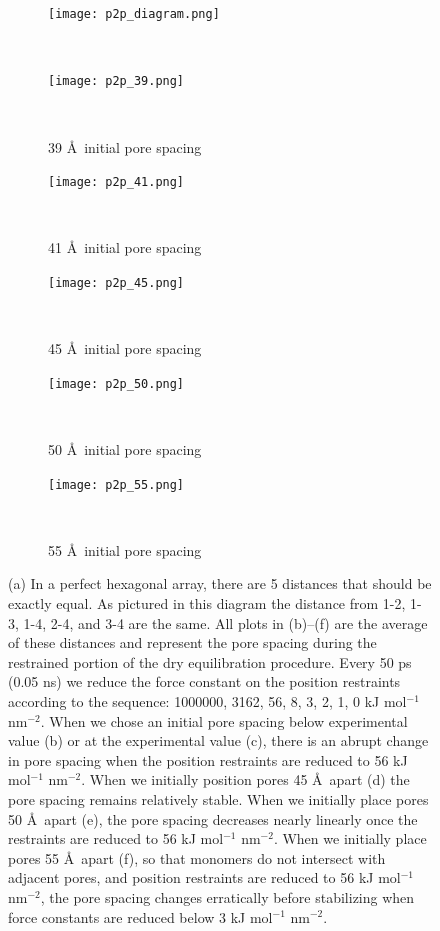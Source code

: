 \documentclass{article}
\begin{document}
  	\begin{figure}[!htb]
	\centering
	\begin{subfigure}{0.3\textwidth}
	\texttt{[image: p2p\_diagram.png]}
	\caption{}~\label{fig:p2p_diagram}
  	\end{subfigure} 
	\begin{subfigure}{0.3\textwidth}
		\texttt{[image: p2p\_39.png]}\quad
		\vspace{-1.25em}
		\caption{39 \AA~initial pore spacing}~\label{fig:p2p_39}
	\end{subfigure}
	\begin{subfigure}{0.3\textwidth}
		\texttt{[image: p2p\_41.png]}\quad
		\vspace{-1.25em}
		\caption{41 \AA~initial pore spacing}~\label{fig:p2p_41}
	\end{subfigure}
	\begin{subfigure}{0.3\textwidth}
		\texttt{[image: p2p\_45.png]}
		\vspace{-1.25em}
		\caption{45 \AA~initial pore spacing}~\label{fig:p2p_45}
	\end{subfigure}
	\begin{subfigure}{0.3\textwidth}
		\texttt{[image: p2p\_50.png]}\quad	
		\vspace{-1.25em}
		\caption{50 \AA~initial pore spacing}~\label{fig:p2p_50}
	\end{subfigure}
	\begin{subfigure}{0.3\textwidth}
		\texttt{[image: p2p\_55.png]}
		\vspace{-1.25em}
		\caption{55 \AA~initial pore spacing}~\label{fig:p2p_55}
	\end{subfigure}
	\caption{(a) In a perfect hexagonal array, there are 5 distances that should be exactly
	equal. As pictured in this diagram the distance from 1-2, 1-3, 1-4, 2-4, and 3-4
	are the same. All plots in (b)--(f) are the average of these distances and represent
	the pore spacing during the restrained portion of the dry equilibration procedure.
	Every 50 ps (0.05 ns) we reduce the force constant on the position restraints according to the sequence: 1000000,
	3162, 56, 8, 3, 2, 1, 0 kJ mol$^{-1}$ nm$^{-2}$. When we chose an initial pore
	spacing below experimental value (b) or at the experimental value (c), there
	is an abrupt change in pore spacing when the position restraints are reduced to 56 kJ
	mol$^{-1}$ nm$^{-2}$. When we initially position pores 45 \AA~apart (d) the pore spacing
	remains relatively stable. When we initially place pores 50 \AA~apart (e), the pore
	spacing decreases nearly linearly once the restraints are reduced to 56 kJ
	mol$^{-1}$ nm$^{-2}$. When we initially place pores 55 \AA~apart (f), so that monomers
	do not intersect with adjacent pores, and position restraints are reduced to 56
	kJ mol$^{-1}$ nm$^{-2}$, the pore spacing changes erratically before stabilizing
	when force constants are reduced below 3 kJ mol$^{-1}$ nm$^{-2}$. } 
	\label{fig:p2p}
  \end{figure}
\end{document}
